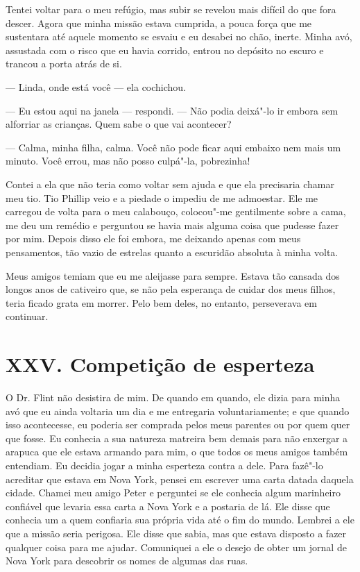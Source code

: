 Tentei voltar para o meu refúgio, mas
subir se revelou mais difícil do que fora descer. Agora que minha missão
estava cumprida, a pouca força que me sustentara até aquele momento se
esvaiu e eu desabei no chão, inerte. Minha avó, assustada com o risco
que eu havia corrido, entrou no depósito no escuro e trancou a porta
atrás de si.

--- Linda, onde está você --- ela
cochichou.

--- Eu estou aqui na janela ---
respondi. --- Não podia deixá"-lo ir embora sem alforriar as crianças.
Quem sabe o que vai acontecer?

--- Calma, minha filha, calma. Você não
pode ficar aqui embaixo nem mais um minuto. Você errou, mas não posso
culpá"-la, pobrezinha!

Contei a ela que não teria como voltar sem ajuda e que ela precisaria
chamar meu tio. Tio Phillip veio e a piedade o impediu de me admoestar.
Ele me carregou de volta para o meu calabouço, colocou"-me gentilmente
sobre a cama, me deu um remédio e perguntou se havia mais alguma coisa
que pudesse fazer por mim. Depois disso ele foi embora, me deixando
apenas com meus pensamentos, tão vazio de estrelas quanto a escuridão
absoluta à minha volta.

Meus amigos temiam que eu me aleijasse
para sempre. Estava tão cansada dos longos anos de cativeiro que, se não
pela esperança de cuidar dos meus filhos, teria ficado grata em morrer.
Pelo bem deles, no entanto, perseverava em continuar.

\chapter{XXV. Competição de
esperteza}

O Dr. Flint não desistira de mim. De
quando em quando, ele dizia para minha avó que eu ainda voltaria um dia
e me entregaria voluntariamente; e que quando isso acontecesse, eu
poderia ser comprada pelos meus parentes ou por quem quer que fosse. Eu
conhecia a sua natureza matreira bem demais para não enxergar a arapuca
que ele estava armando para mim, o que todos os meus amigos também
entendiam. Eu decidia jogar a minha esperteza contra a dele. Para
fazê"-lo acreditar que estava em Nova York, pensei em escrever uma carta
datada daquela cidade. Chamei meu amigo Peter e perguntei se ele
conhecia algum marinheiro confiável que levaria essa carta a Nova York e
a postaria de lá. Ele disse que conhecia um a quem confiaria sua própria
vida até o fim do mundo. Lembrei a ele que a missão seria perigosa. Ele
disse que sabia, mas que estava disposto a fazer qualquer coisa para me
ajudar. Comuniquei a ele o desejo de obter um jornal de Nova York para
descobrir os nomes de algumas das ruas.


